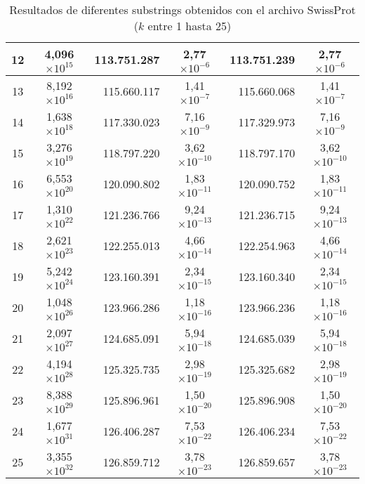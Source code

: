 \begin{table}[!hbt]
\begin{tabular}{| c  r  r  c  r  c |}
    12 & \multicolumn{1}{c}{4,096$\times 10^{15}$} & 113.751.287 & 2,77$\times 10^{-6}$ & 113.751.239 & 2,77$\times 10^{-6}$ \\ \hline  
    13 & \multicolumn{1}{c}{8,192$\times 10^{16}$} & 115.660.117 & 1,41$\times 10^{-7}$ & 115.660.068 & 1,41$\times 10^{-7}$ \\ \hline
    14 & \multicolumn{1}{c}{1,638$\times 10^{18}$} & 117.330.023 & 7,16$\times 10^{-9}$ & 117.329.973 & 7,16$\times 10^{-9}$ \\ \hline  
    15 & \multicolumn{1}{c}{3,276$\times 10^{19}$} & 118.797.220 & 3,62$\times 10^{-10}$ & 118.797.170 & 3,62$\times 10^{-10}$ \\ \hline
    16 & \multicolumn{1}{c}{6,553$\times 10^{20}$} & 120.090.802 & 1,83$\times 10^{-11}$ & 120.090.752 & 1,83$\times 10^{-11}$ \\ \hline  
    17 & \multicolumn{1}{c}{1,310$\times 10^{22}$} & 121.236.766 & 9,24$\times 10^{-13}$ & 121.236.715 & 9,24$\times 10^{-13}$ \\ \hline
    18 & \multicolumn{1}{c}{2,621$\times 10^{23}$} & 122.255.013 & 4,66$\times 10^{-14}$ & 122.254.963 & 4,66$\times 10^{-14}$ \\ \hline  
    19 & \multicolumn{1}{c}{5,242$\times 10^{24}$} & 123.160.391 & 2,34$\times 10^{-15}$ & 123.160.340 & 2,34$\times 10^{-15}$ \\ \hline
    20 & \multicolumn{1}{c}{1,048$\times 10^{26}$} & 123.966.286 & 1,18$\times 10^{-16}$ & 123.966.236 & 1,18$\times 10^{-16}$ \\ \hline  
    21 & \multicolumn{1}{c}{2,097$\times 10^{27}$} & 124.685.091 & 5,94$\times 10^{-18}$ & 124.685.039 & 5,94$\times 10^{-18}$ \\ \hline
    22 & \multicolumn{1}{c}{4,194$\times 10^{28}$} & 125.325.735 & 2,98$\times 10^{-19}$ & 125.325.682 & 2,98$\times 10^{-19}$ \\ \hline  
    23 & \multicolumn{1}{c}{8,388$\times 10^{29}$} & 125.896.961 & 1,50$\times 10^{-20}$ & 125.896.908 & 1,50$\times 10^{-20}$ \\ \hline
    24 & \multicolumn{1}{c}{1,677$\times 10^{31}$} & 126.406.287 & 7,53$\times 10^{-22}$ & 126.406.234 & 7,53$\times 10^{-22}$ \\ \hline  
    25 & \multicolumn{1}{c}{3,355$\times 10^{32}$} & 126.859.712 & 3,78$\times 10^{-23}$ & 126.859.657 & 3,78$\times 10^{-23}$ \\ \hline        
    \end{tabular}
    \caption{Resultados de diferentes substrings obtenidos con el archivo SwissProt ($k$ entre 1 hasta 25)}
    \label{tb:labela11}
\end{table}

